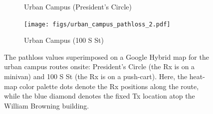 \documentclass[12pt, draftcls, onecolumn]{IEEEtran}
\begin{document}
{\begin{figure} [t]
\begin{subfigure}{0.563\linewidth}
         \caption{Urban Campus (President's Circle)}
         \label{F5a}
     \end{subfigure}
     \begin{subfigure}{0.427\linewidth}
         \centering
         \texttt{[image: figs/urban\_campus\_pathloss\_2.pdf]}
         \caption{Urban Campus (100 S St)}
         \label{F5b}
     \end{subfigure}
     \vspace{-8mm}
     \caption{The pathloss values superimposed on a Google Hybrid map for the urban campus routes onsite: President's Circle (the Rx is on a minivan) and 100 S St (the Rx is on a push-cart). Here, the heat-map color palette dots denote the Rx positions along the route, while the blue diamond denotes the fixed Tx location atop the William Browning building.}
     \label{F5}
\end{figure}

}
\end{document}
